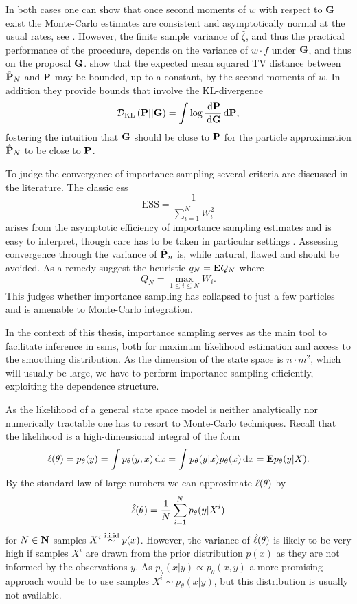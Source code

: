 In both cases one can show that once second moments of $w$ with respect to $\G$ exist the Monte-Carlo estimates are consistent and asymptotically normal at the usual rates, see \cite[Chapter 8]{Chopin2020Introduction}. 
However, the finite sample variance of $\hat\zeta$, and thus the practical performance of the procedure, depends on the variance of $w\cdot f$ under $\G$, and thus on the proposal $\G$. \cite{Agapiou2017Importance} show that  the expected mean squared TV distance  between $\hat \P_N$ and  $\P$ may be bounded, up to a constant, by the second moments of $w$. In addition they provide bounds that involve the KL-divergence 
$$
\Dkl{\P}{\G} = \int \log \frac{\d \P}{\d \G} \d \P,
$$
fostering the intuition that $\G$ should be close to $\P$ for the particle approximation $\hat\P_{N}$ to be close to $\P$.

To judge the convergence of importance sampling several criteria are discussed in the literature. The classic \gls{ess}\cite{Kong1994Sequential} 
$$
\text{ESS} = \frac{1}{\sum_{i = 1}^N W^{2}_{i}}
$$
arises from the asymptotic efficiency of importance sampling estimates and is easy to interpret, though care has to be taken in particular settings . Assessing convergence through the variance of $\hat \P_{n}$ is, while natural, flawed \cite{Chatterjee2018Sample} and should be avoided. As a remedy \cite{Chatterjee2018Sample} suggest the heuristic $q_{N} = \E Q_{N}$ where
$$
Q_{N} = \max_{1\leq i\leq N} W_{i}.
$$
This judges whether importance sampling has collapsed to just a few particles and is amenable to Monte-Carlo integration.


In the context of this thesis, importance sampling serves as the main tool to facilitate inference in \glspl{ssm}, both for maximum likelihood estimation and access to the smoothing distribution. As the dimension of the state space is $n\cdot m^{2}$, which will usually be large, we have to perform importance sampling efficiently, exploiting the dependence structure. 

As the likelihood of a general state space model is neither analytically nor numerically tractable one has to resort to Monte-Carlo techniques.
Recall that the likelihood is a high-dimensional integral of the form
\begin{align*}
    \lik(\theta) = p_\theta(y) = \int p_\theta(y,x) \d x = \int p_\theta(y|x) p_\theta(x) \d x = \E p_\theta(y|X).
\end{align*}
By the standard law of large numbers we can approximate $\lik(\theta)$ by
\begin{align*}
    \hat\lik(\theta) = \frac 1 N \sum_{i=1}^N p_\theta(y|X^i)
\end{align*}
for $N\in\N$ samples $X^i \iid p(x)$.
However, the variance of $\hat\lik(\theta)$ is likely to be very high if samples $X^i$ are drawn from the prior distribution $p(x)$ as they are not informed by the observations $y$.
As $p_\theta(x|y) \propto p_\theta(x,y)$ a more promising approach would be to use samples $X^i \sim p_\theta(x|y)$, but this distribution is usually not available.

